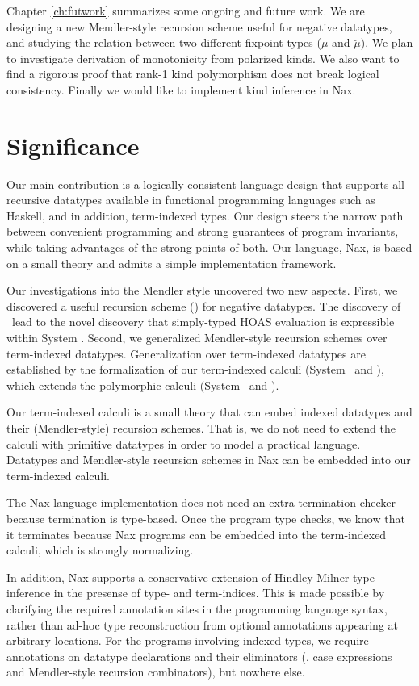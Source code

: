 Chapter \ref{ch:futwork} summarizes some ongoing and future work.
We are designing a new Mendler-style recursion scheme useful
for negative datatypes, and studying the relation between two different
fixpoint types ($\mu$ and $\breve\mu$). We plan to investigate derivation of
monotonicity from polarized kinds. We also want to find a rigorous proof 
that rank-1 kind polymorphism does not break logical consistency.
Finally we would like to implement kind inference in Nax.

\section{Significance}\label{sec:concl:sig}
Our main contribution is a logically consistent language design that supports
all recursive datatypes available in functional programming languages such as
Haskell, and in addition, term-indexed types. Our design steers the narrow
path between
convenient programming and strong guarantees of program invariants, while taking
advantages of the strong points of both. Our language, Nax, is based on a small theory and
admits a simple implementation framework.

Our investigations into the Mendler style uncovered two new aspects.
First, we discovered a useful recursion scheme (\MsfIt) for negative datatypes.
The discovery of \MsfIt\ lead to the novel discovery that simply-typed HOAS
evaluation is expressible within System \Fw. Second, we generalized
Mendler-style recursion schemes over term-indexed datatypes.
Generalization over term-indexed datatypes are established by
the formalization of our term-indexed calculi (System \Fi\ and \Fixi),
which extends the polymorphic calculi (System \Fw\ and \Fixw).

Our term-indexed calculi is a small theory that can embed indexed datatypes
and their (Mendler-style) recursion schemes. That is, we do not need to extend
the calculi with primitive datatypes in order to model a practical language.
Datatypes and Mendler-style recursion schemes in Nax can be embedded into
our term-indexed calculi.

The Nax language implementation does not need an extra termination checker
because termination is type-based. Once the program type checks, we know
that it terminates because Nax programs can be embedded into
the term-indexed calculi, which is strongly normalizing.

In addition, Nax supports a conservative extension of Hindley-Milner
type inference in the presense of type- and term-indices.
This is made possible by clarifying the required annotation sites
in the programming language syntax, rather than ad-hoc type reconstruction
from optional annotations appearing at arbitrary locations.
For the programs involving indexed types, we require annotations
on datatype declarations and their eliminators
(\ie, case expressions and Mendler-style recursion combinators),
but nowhere else.

